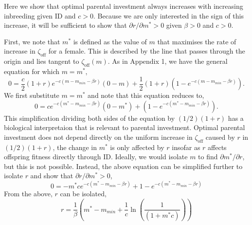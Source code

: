 \documentclass[12pt]{article}
\begin{document}
Here we show that optimal parental investment always increases with increasing inbreeding given ID and $c>0$. Because we are only interested in the sign of this increase, it will be sufficient to show that $\partial r / \partial m^{*} > 0$ given $\beta>0$ and $c>0$. 

First, we note that $m^{*}$ is defined as the value of $m$ that maximises the rate of increase in $\zeta_{\textrm{off}}$ for a female. This is described by the line that passes through the origin and lies tangent to $\zeta_{\textrm{off}}(m)$. As in Appendix 1, we have the general equation for which $m=m^{*}$,
\begin{equation}
0 = \frac{c}{2} \left(1+r\right)e^{-c\left(m-m_{min}-\beta r\right)}\left(0-m\right) + \frac{1}{2}\left(1+r\right)\left(1-e^{-c\left(m-m_{min}-\beta r\right)}\right).
\end{equation}
We first substitute $m=m^{*}$ and note that this equation reduces to,
\begin{equation}
0 = c e^{-c\left(m^{*}-m_{min}-\beta r\right)}\left(0-m^{*}\right) + \left(1-e^{-c\left(m^{*}-m_{min}-\beta r\right)}\right). 
\end{equation}
This simplification dividing both sides of the equation by $(1/2)(1+r)$ has a biological interpretaion that is relevant to parental investment. Optimal parental investment does not depend directly on the uniform increase in $\zeta_{\textrm{off}}$ caused by $r$ in $(1/2)(1+r)$, the change in $m^{*}$ is only affected by $r$ insofar as $r$ affects offspring fitness directly through ID. Ideally, we would isolate $m$ to find $\partial m^{*} / \partial r$, but this is not possible. Instead, the above equation can be simplified further to isolate $r$ and show that $\partial r / \partial m^{*} > 0$,
\begin{equation}
0 = -m^{*} c e^{-c\left(m^{*}-m_{min}-\beta r\right)} + 1-e^{-c\left(m^{*}-m_{min}-\beta r\right)}
\end{equation}
From the above, $r$ can be isolated,
\begin{equation}
r = \frac{1}{\beta}\left(m^{*} - m_{min} + \frac{1}{c}\ln\left(\frac{1}{\left(1 + m^{*} c\right)}\right)\right)
\end{equation}
\end{document}
